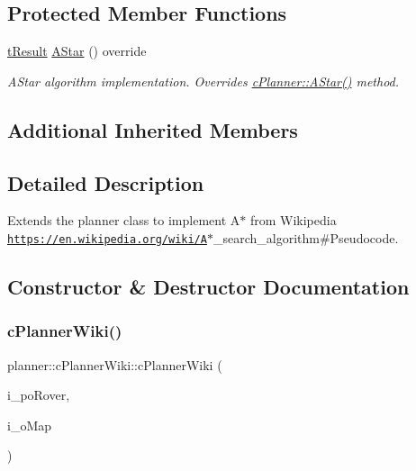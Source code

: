 \subsection*{Protected Member Functions}
\begin{DoxyCompactItemize}
\item 
\mbox{\hyperlink{structt_result}{t\+Result}} \mbox{\hyperlink{classplanner_1_1c_planner_wiki_a2652cf0e84d0a1fcd17e6c4288179955}{A\+Star}} () override
\begin{DoxyCompactList}\small\item\em A\+Star algorithm implementation. Overrides \mbox{\hyperlink{classplanner_1_1c_planner_a341e70531266f023ac9461d18979d1ef}{c\+Planner\+::\+A\+Star()}} method. \end{DoxyCompactList}\end{DoxyCompactItemize}
\subsection*{Additional Inherited Members}


\subsection{Detailed Description}
Extends the planner class to implement A$\ast$ from Wikipedia \href{https://en.wikipedia.org/wiki/A}{\tt https\+://en.\+wikipedia.\+org/wiki/A}$\ast$\+\_\+search\+\_\+algorithm\#\+Pseudocode. 

\subsection{Constructor \& Destructor Documentation}
\mbox{\label{classplanner_1_1c_planner_wiki_aed6ae97e85a338e082ec2879629f0f3b}} 
\subsubsection{\texorpdfstring{c\+Planner\+Wiki()}{cPlannerWiki()}}
{\footnotesize\ttfamily planner\+::c\+Planner\+Wiki\+::c\+Planner\+Wiki (\begin{DoxyParamCaption}\item[{std\+::shared\+\_\+ptr$<$ \mbox{\hyperlink{classplanner_1_1c_rover_interface}{c\+Rover\+Interface}}$<$ 8 $>$$>$}]{i\+\_\+po\+Rover,  }\item[{std\+::shared\+\_\+ptr$<$ \mbox{\hyperlink{classplanner_1_1c_graph}{c\+Graph}} $>$}]{i\+\_\+o\+Map }\end{DoxyParamCaption})}




